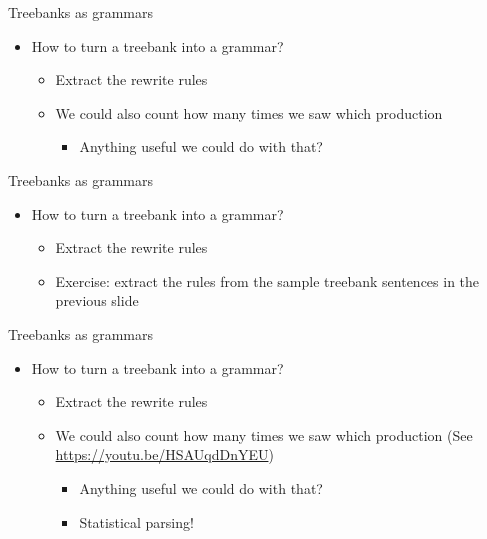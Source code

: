 \documentclass{beamer}
\begin{document}
\begin{frame}{Treebanks as grammars}
\begin{itemize}
\item How to turn a treebank into a grammar?
  \begin{itemize}
  \item Extract the rewrite rules
  \item We could also count how many times we saw which production
    \begin{itemize}
    \item Anything useful we could do with that?
    \end{itemize}
  \end{itemize}
\end{itemize}
\end{frame}

\begin{frame}{Treebanks as grammars}
  \begin{itemize}
  \item How to turn a treebank into a grammar?
    \begin{itemize}
    \item Extract the rewrite rules
    \item Exercise: extract the rules from the sample treebank sentences in the previous slide
    \end{itemize}
  \end{itemize}
\end{frame}


\begin{frame}{Treebanks as grammars}
\begin{itemize}
\item How to turn a treebank into a grammar?
  \begin{itemize}
  \item Extract the rewrite rules
  \item We could also count how many times we saw which production (See \url{https://youtu.be/HSAUqdDnYEU})
    \begin{itemize}
    \item Anything useful we could do with that?
    \item Statistical parsing! 
    \end{itemize}
  \end{itemize}
\end{itemize}
\end{frame}
\end{document}
